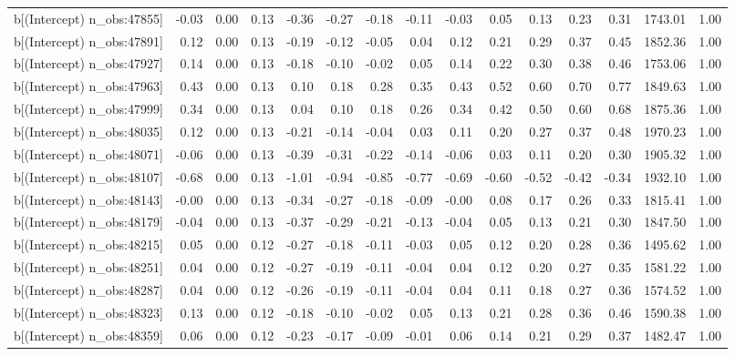 \begin{table}[ht]
\begin{tabular}{rrrrrrrrrrrrrrr}
  b[(Intercept) n\_obs:47855] & -0.03 & 0.00 & 0.13 & -0.36 & -0.27 & -0.18 & -0.11 & -0.03 & 0.05 & 0.13 & 0.23 & 0.31 & 1743.01 & 1.00 \\ 
  b[(Intercept) n\_obs:47891] & 0.12 & 0.00 & 0.13 & -0.19 & -0.12 & -0.05 & 0.04 & 0.12 & 0.21 & 0.29 & 0.37 & 0.45 & 1852.36 & 1.00 \\ 
  b[(Intercept) n\_obs:47927] & 0.14 & 0.00 & 0.13 & -0.18 & -0.10 & -0.02 & 0.05 & 0.14 & 0.22 & 0.30 & 0.38 & 0.46 & 1753.06 & 1.00 \\ 
  b[(Intercept) n\_obs:47963] & 0.43 & 0.00 & 0.13 & 0.10 & 0.18 & 0.28 & 0.35 & 0.43 & 0.52 & 0.60 & 0.70 & 0.77 & 1849.63 & 1.00 \\ 
  b[(Intercept) n\_obs:47999] & 0.34 & 0.00 & 0.13 & 0.04 & 0.10 & 0.18 & 0.26 & 0.34 & 0.42 & 0.50 & 0.60 & 0.68 & 1875.36 & 1.00 \\ 
  b[(Intercept) n\_obs:48035] & 0.12 & 0.00 & 0.13 & -0.21 & -0.14 & -0.04 & 0.03 & 0.11 & 0.20 & 0.27 & 0.37 & 0.48 & 1970.23 & 1.00 \\ 
  b[(Intercept) n\_obs:48071] & -0.06 & 0.00 & 0.13 & -0.39 & -0.31 & -0.22 & -0.14 & -0.06 & 0.03 & 0.11 & 0.20 & 0.30 & 1905.32 & 1.00 \\ 
  b[(Intercept) n\_obs:48107] & -0.68 & 0.00 & 0.13 & -1.01 & -0.94 & -0.85 & -0.77 & -0.69 & -0.60 & -0.52 & -0.42 & -0.34 & 1932.10 & 1.00 \\ 
  b[(Intercept) n\_obs:48143] & -0.00 & 0.00 & 0.13 & -0.34 & -0.27 & -0.18 & -0.09 & -0.00 & 0.08 & 0.17 & 0.26 & 0.33 & 1815.41 & 1.00 \\ 
  b[(Intercept) n\_obs:48179] & -0.04 & 0.00 & 0.13 & -0.37 & -0.29 & -0.21 & -0.13 & -0.04 & 0.05 & 0.13 & 0.21 & 0.30 & 1847.50 & 1.00 \\ 
  b[(Intercept) n\_obs:48215] & 0.05 & 0.00 & 0.12 & -0.27 & -0.18 & -0.11 & -0.03 & 0.05 & 0.12 & 0.20 & 0.28 & 0.36 & 1495.62 & 1.00 \\ 
  b[(Intercept) n\_obs:48251] & 0.04 & 0.00 & 0.12 & -0.27 & -0.19 & -0.11 & -0.04 & 0.04 & 0.12 & 0.20 & 0.27 & 0.35 & 1581.22 & 1.00 \\ 
  b[(Intercept) n\_obs:48287] & 0.04 & 0.00 & 0.12 & -0.26 & -0.19 & -0.11 & -0.04 & 0.04 & 0.11 & 0.18 & 0.27 & 0.36 & 1574.52 & 1.00 \\ 
  b[(Intercept) n\_obs:48323] & 0.13 & 0.00 & 0.12 & -0.18 & -0.10 & -0.02 & 0.05 & 0.13 & 0.21 & 0.28 & 0.36 & 0.46 & 1590.38 & 1.00 \\ 
  b[(Intercept) n\_obs:48359] & 0.06 & 0.00 & 0.12 & -0.23 & -0.17 & -0.09 & -0.01 & 0.06 & 0.14 & 0.21 & 0.29 & 0.37 & 1482.47 & 1.00 \\ 

\end{tabular}
\end{table}
